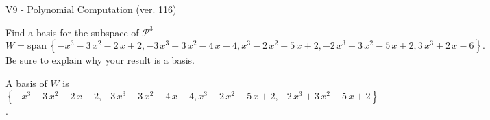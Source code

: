 \begin{exercise}
  \begin{exerciseTitle}V9 - Polynomial Computation (ver. 116)\end{exerciseTitle}
  \begin{exerciseStatement}
    Find a basis for the subspace of \(\mathcal{P}^3\) 
\[W=\mathrm{span}\ \left\{-x^{3} - 3 \, x^{2} - 2 \, x + 2 , -3 \, x^{3} - 3 \, x^{2} - 4 \, x - 4 , x^{3} - 2 \, x^{2} - 5 \, x + 2 , -2 \, x^{3} + 3 \, x^{2} - 5 \, x + 2 , 3 \, x^{3} + 2 \, x - 6\right\}.\]
 Be sure to explain why your result is a basis.


  \end{exerciseStatement}
  \begin{exerciseAnswer}
   A basis of \(W\) is  \(\left\{-x^{3} - 3 \, x^{2} - 2 \, x + 2 , -3 \, x^{3} - 3 \, x^{2} - 4 \, x - 4 , x^{3} - 2 \, x^{2} - 5 \, x + 2 , -2 \, x^{3} + 3 \, x^{2} - 5 \, x + 2\right\}\).
  


  \end{exerciseAnswer}
\end{exercise}